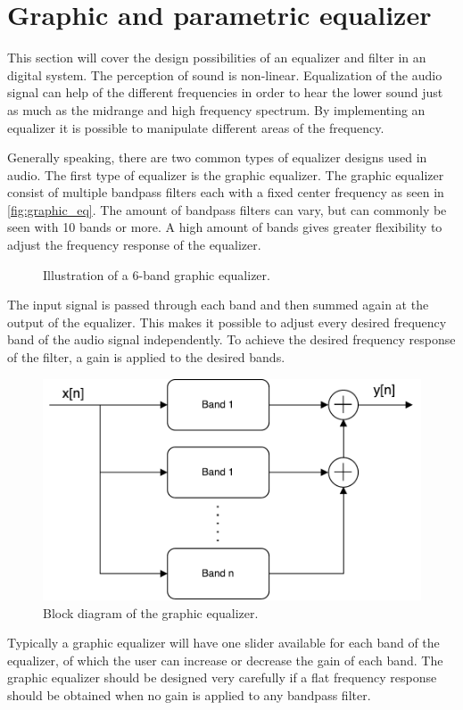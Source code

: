 \section{Graphic and parametric equalizer}\label{sec:tech_equalizer}
This section will cover the design possibilities of an equalizer and filter in an digital system. The perception of sound is non-linear. Equalization of the audio signal can help  of the different frequencies in order to hear the lower sound just as much as the midrange and high frequency spectrum. By implementing an equalizer it is possible to manipulate different areas of the frequency.

Generally speaking, there are two common types of equalizer designs used in audio. The first type of equalizer is the graphic equalizer. The graphic equalizer consist of multiple bandpass filters each with a fixed center frequency as seen in \autoref{fig:graphic_eq}. The amount of bandpass filters can vary, but can commonly be seen with 10 bands or more. A high amount of bands gives greater flexibility to adjust the frequency response of the equalizer.

\begin{figure}[H]
\centering
{}

\caption{Illustration of a 6-band graphic equalizer.}
\label{fig:graphic_eq}
\end{figure}

The input signal is passed through each band and then summed again at the output of the equalizer. This makes it possible to adjust every desired frequency band of the audio signal independently. To achieve the desired frequency response of the filter, a gain is applied to the desired bands.

\begin{figure}[H]
\centering
\includegraphics[width=0.6 \textwidth]{figures/graphic_eq_block.pdf}
\caption{Block diagram of the graphic equalizer.}
\label{fig:graphic_eq_block}
\end{figure}

Typically a graphic equalizer will have one slider available for each band of the equalizer, of which the user can increase or decrease the gain of each band. The graphic equalizer should be designed very carefully if a flat frequency response should be obtained when no gain is applied to any bandpass filter.

